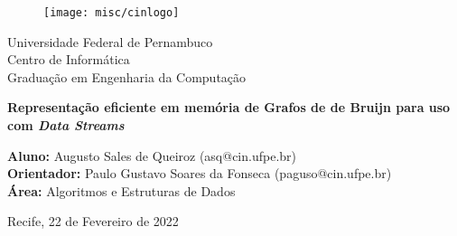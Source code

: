 \begin{figure}[!htpb]
	\centering
	\texttt{[image: misc/cinlogo]}
\end{figure}

\vspace{1cm}
\begin{center}
	{Universidade Federal de Pernambuco\\
	Centro de Informática\\
	Graduação em Engenharia da Computação}
\end{center}
\vspace{2cm}
\begin{center}
	\large{\textbf{Representação eficiente em memória de Grafos de de Bruijn para uso com \emph{Data Streams}}}
\end{center}
\vspace{2.5cm}

\begin{center}
    \textbf{Aluno:} Augusto Sales de Queiroz (asq@cin.ufpe.br) \\
    \leavevmode \newline
    \textbf{Orientador:} Paulo Gustavo Soares da Fonseca (paguso@cin.ufpe.br) \\
    \leavevmode \newline
    \textbf{Área:} Algoritmos e Estruturas de Dados \\
\end{center}

\vspace{4cm}
\begin{center}
    Recife,
    22 de Fevereiro de 2022
\end{center}

\thispagestyle{empty}